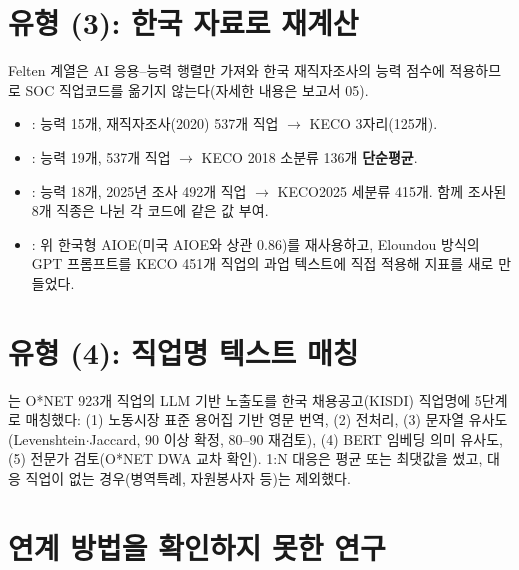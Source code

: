 \documentclass[11pt]{article}
\begin{document}
\section{유형 (3): 한국 자료로 재계산}

Felten 계열은 AI 응용–능력 행렬만 가져와 한국 재직자조사의 능력 점수에 적용하므로 SOC 직업코드를 옮기지 않는다(자세한 내용은 보고서 05).

\begin{itemize}
  \item \textcite{cheon-2022-ai-employment-wage-effects}: 능력 15개, 재직자조사(2020) 537개 직업 $\to$ KECO 3자리(125개).
  \item \textcite{kiet-2025-ai-occupational-employment-effect}: 능력 19개, 537개 직업 $\to$ KECO 2018 소분류 136개 \textbf{단순평균}.
  \item \textcite{yoon-2026-employment-admin-db-ai-exposure}: 능력 18개, 2025년 조사 492개 직업 $\to$ KECO2025 세분류 415개. 함께 조사된 8개 직종은 나뉜 각 코드에 같은 값 부여.
  \item \textcite{cheon-2025-ai-exposure-vs-ai-adoption}: 위 한국형 AIOE(미국 AIOE와 상관 0.86)를 재사용하고, Eloundou 방식의 GPT 프롬프트를 KECO 451개 직업의 과업 텍스트에 직접 적용해 지표를 새로 만들었다.
\end{itemize}

\section{유형 (4): 직업명 텍스트 매칭}

\textcite{keis-2025-ai-job-exposure-labor-demand}는 O*NET 923개 직업의 LLM 기반 노출도를 한국 채용공고(KISDI) 직업명에 5단계로 매칭했다: (1) 노동시장 표준 용어집 기반 영문 번역, (2) 전처리, (3) 문자열 유사도(Levenshtein$\cdot$Jaccard, 90 이상 확정, 80--90 재검토), (4) BERT 임베딩 의미 유사도, (5) 전문가 검토(O*NET DWA 교차 확인). 1:N 대응은 평균 또는 최댓값을 썼고, 대응 직업이 없는 경우(병역특례, 자원봉사자 등)는 제외했다.

\section{연계 방법을 확인하지 못한 연구}
\end{document}
